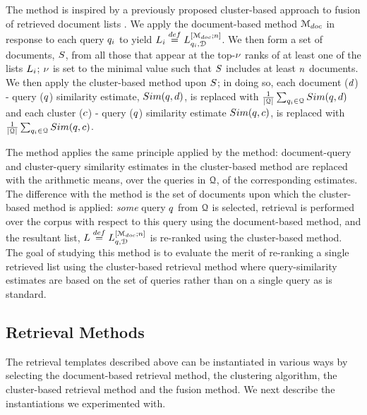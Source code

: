 \myparagraph{\poolClustNoR} The \firstmention{\poolClustNoR} method is
inspired by a previously proposed cluster-based approach to fusion of
retrieved document lists \cite{Kozorovitzky+Kurland:11b}. We apply the
document-based method ${\mathcal M_{doc}}$ in response to each query
$q_i$ to yield $L_i \stackrel{def}{=}
L_{q_i,{\mathcal D}}^{[{\mathcal M_{doc}};n]}$. We then form a
set of documents, $S$, from all those that appear at the
top-$\nu$ ranks of at least one of the lists $L_i$;
$\nu$ is set to the minimal value such that $S$ includes
at least $n$ documents. We then apply the cluster-based method upon $S$; in doing so, each document ($d$) - query ($q$) similarity estimate, $Sim(q,d)$, is replaced with $\frac{1}{\vert {\mathcal Q} \vert} \sum_{q_i \in {\mathcal Q}} Sim(q,d)$ and each cluster ($c$) - query ($q$) similarity estimate $Sim(q,c)$, is replaced with $\frac{1}{\vert {\mathcal Q} \vert} \sum_{q_i \in {\mathcal Q}} Sim(q,c)$.

\myparagraph{\featureNoR}
The \firstmention{\featureNoR} method applies the same principle applied by the \poolClust method: document-query and cluster-query similarity estimates in the cluster-based method are replaced with the arithmetic means, over the queries in ${\mathcal Q}$, of the corresponding estimates. The difference with the \poolClust method is the set of documents upon which the cluster-based method is applied: {\em some} query $q$ from ${\mathcal Q}$ is selected, retrieval is performed over the corpus with respect to this query using the document-based method, and the resultant list, $L \stackrel{def}{=} L_{q,{\mathcal D}}^{[{\mathcal M_{doc}};n]}$ is re-ranked using the cluster-based method. The goal of studying this method is to evaluate the merit of re-ranking a single retrieved list using the cluster-based retrieval method where query-similarity estimates are based on the set of queries rather than on a single query as is standard.

\subsection{Retrieval Methods}
\label{sec:retAlg}
The retrieval templates described above can be instantiated in various
ways by selecting the document-based retrieval method, the clustering
algorithm, the cluster-based retrieval method and the fusion
method. We next describe the instantiations we experimented with.


